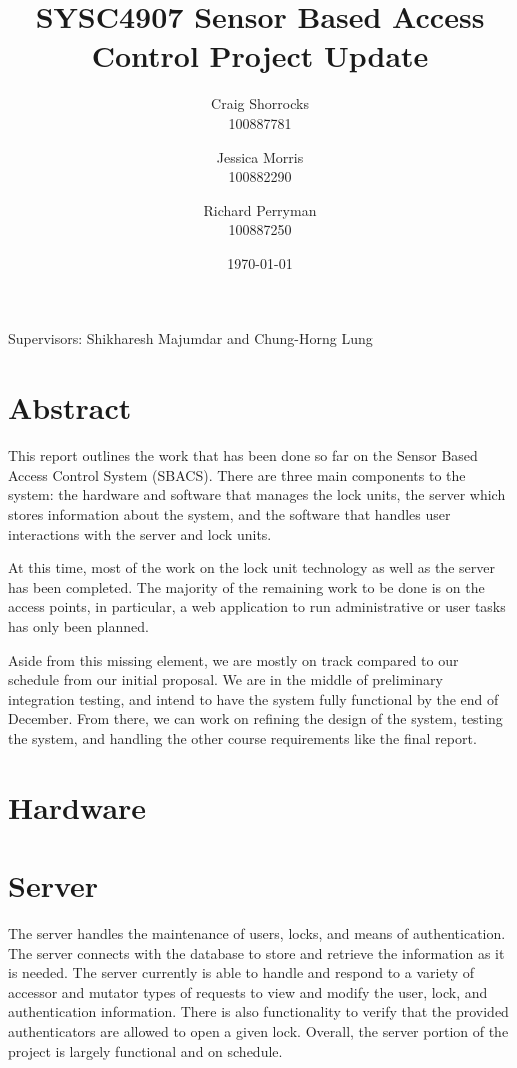 \documentclass{article}
\title{SYSC4907 Sensor Based Access Control Project Update}
\author{
	Craig Shorrocks \\
	100887781
	\and
	Jessica Morris \\
	100882290
	\and
	Richard Perryman \\
	100887250
}
\date{\today}
\begin{document}
\maketitle

\begin{center}
Supervisors: Shikharesh Majumdar and Chung-Horng Lung
\end{center}

\pagebreak

\section{Abstract}

This report outlines the work that has been done so far on the Sensor Based Access Control System (SBACS). There are
three main components to the system: the hardware and software that manages the lock units, the server which stores
information about the system, and the software that handles user interactions with the server and lock units.

At this time, most of the work on the lock unit technology as well as the server has been completed. The majority of the
remaining work to be done is on the access points, in particular, a web application to run administrative or user tasks
has only been planned.

Aside from this missing element, we are mostly on track compared to our schedule from our initial proposal. We are in
the middle of preliminary integration testing, and intend to have the system fully functional by the end of December.
From there, we can work on refining the design of the system, testing the system, and handling the other course
requirements like the final report.

\section{Hardware}

\section{Server}

The server handles the maintenance of users, locks, and means of authentication. The server connects with the database
to store and retrieve the information as it is needed. The server currently is able to handle and respond to a variety
of accessor and mutator types of requests to view and modify the user, lock, and authentication information. There is
also functionality to verify that the provided authenticators are allowed to open a given lock. Overall, the server
portion of the project is largely functional and on schedule.
\end{document}
